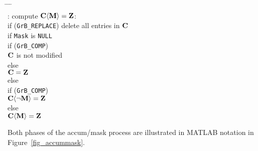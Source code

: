 \documentclass[12pt]{article}
\begin{document}
    {\small
    \begin{tabbing}
    \hspace{2em} \= \hspace{2em} \= \hspace{2em} \= \hspace{2em} \= \\
    : compute ${\bf C \langle M \rangle = Z}$: \\
    \> \> if (\verb'GrB_REPLACE') delete all entries in ${\bf C}$ \\
    \> \> if \verb'Mask' is \verb'NULL' \\
    \> \>\>    if (\verb'GrB_COMP') \\
    \> \>\>\>      ${\bf C}$ is not modified \\
    \> \>\>    else \\
    \> \>\>\>      ${\bf C = Z}$ \\
    \> \> else \\
    \> \>\>    if (\verb'GrB_COMP') \\
    \> \>\>\>      ${\bf C \langle \neg M \rangle  = Z}$ \\
    \> \>\>    else \\
    \> \>\>\>      ${\bf C \langle M \rangle  = Z}$
    \end{tabbing} }
Both phases of the accum/mask process are illustrated in MATLAB notation in
Figure~\ref{fig_accummask}.
\end{document}
